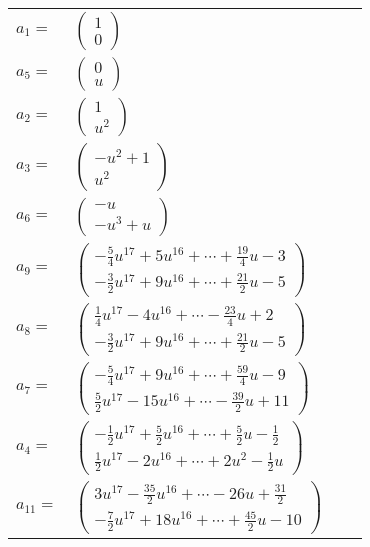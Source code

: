 \documentclass[1p]{elsarticle_modified}
\theoremstyle{definition}
\begin{document}
\begin{tabular}{m{7pt} m{180pt} m{7pt} m{180pt} }
\flushright $a_{1}=$&$\begin{pmatrix}1\\0\end{pmatrix}$ \\
\flushright $a_{5}=$&$\begin{pmatrix}0\\u\end{pmatrix}$ \\
\flushright $a_{2}=$&$\begin{pmatrix}1\\u^2\end{pmatrix}$ \\
\flushright $a_{3}=$&$\begin{pmatrix}- u^2+1\\u^2\end{pmatrix}$ \\
\flushright $a_{6}=$&$\begin{pmatrix}- u\\- u^3+u\end{pmatrix}$ \\
\flushright $a_{9}=$&$\begin{pmatrix}-\frac{5}{4} u^{17}+5 u^{16}+\cdots+\frac{19}{4} u-3\\-\frac{3}{2} u^{17}+9 u^{16}+\cdots+\frac{21}{2} u-5\end{pmatrix}$ \\
\flushright $a_{8}=$&$\begin{pmatrix}\frac{1}{4} u^{17}-4 u^{16}+\cdots-\frac{23}{4} u+2\\-\frac{3}{2} u^{17}+9 u^{16}+\cdots+\frac{21}{2} u-5\end{pmatrix}$ \\
\flushright $a_{7}=$&$\begin{pmatrix}-\frac{5}{4} u^{17}+9 u^{16}+\cdots+\frac{59}{4} u-9\\\frac{5}{2} u^{17}-15 u^{16}+\cdots-\frac{39}{2} u+11\end{pmatrix}$ \\
\flushright $a_{4}=$&$\begin{pmatrix}-\frac{1}{2} u^{17}+\frac{5}{2} u^{16}+\cdots+\frac{5}{2} u-\frac{1}{2}\\\frac{1}{2} u^{17}-2 u^{16}+\cdots+2 u^2-\frac{1}{2} u\end{pmatrix}$ \\
\flushright $a_{11}=$&$\begin{pmatrix}3 u^{17}-\frac{35}{2} u^{16}+\cdots-26 u+\frac{31}{2}\\-\frac{7}{2} u^{17}+18 u^{16}+\cdots+\frac{45}{2} u-10\end{pmatrix}$ \\

\end{tabular}
\end{document}
